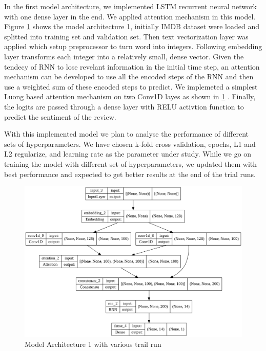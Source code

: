 \documentclass{article}
\begin{document}
In the first model architecture, we implemented LSTM recurrent neural network with one dense layer in the end. We applied attention mechanism in this model. Figure \ref{fig:compute1} shows the model architecture 1, initially IMDB dataset were loaded and splitted into training set and validation set. Then text vectorization layer was applied which setup preprocessor to turn word into integers. Following embedding layer transforms each integer into a relatively small, dense vector. Given the tendecy of RNN to lose revelant information in the initial time step, an attention mechanism can be developed to use all the encoded steps of the RNN and then use a weighted sum of these encoded steps to predict. We implemeted a simplest Luong based attention mechanism on two Conv1D layes as shown in \ref{fig:compute1} \cite{luong2015effective}. Finally, the logits are passed through a dense layer with RELU activtion function to predict the sentiment of the review. \par
With this implemented model we plan to analyse the performance of different sets of hyperparameters. We have chosen k-fold cross validation, epochs, L1 and L2 regularize,  and learning rate as the parameter under study. While we go on training the model with different set of hyperparameters, we updated them with best performance and expected to get better results at the end of  the trial runs.

\begin{figure}[H]
    \centering
    \includegraphics[width=\textwidth]{Model1.PNG}
    \caption{Model Architecture 1 with various trail run}
    \label{fig:compute1}
\end{figure}
\end{document}
